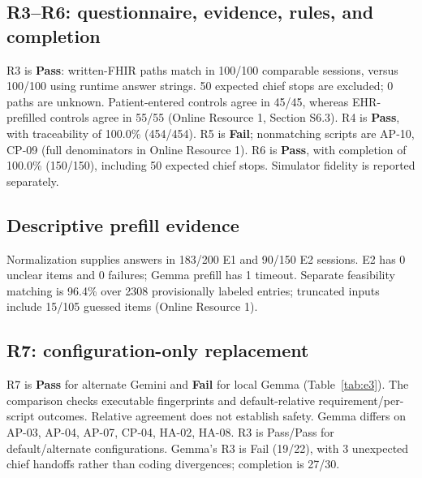 \documentclass[lineno,pdflatex,sn-basic]{sn-jnl}%
\theoremstyle{thmstyleone}%
\theoremstyle{thmstyletwo}%
\theoremstyle{thmstylethree}%
\newcommand{\RThreeVerdict}{Pass}
\newcommand{\RFourVerdict}{Pass}
\newcommand{\RFiveVerdict}{Fail}
\newcommand{\RFiveFailingScripts}{AP-10, CP-09}
\newcommand{\RSixVerdict}{Pass}
\newcommand{\EThreeDefaultRThreeVerdict}{Pass}
\newcommand{\EThreeAlternateSwapVerdict}{Pass}
\newcommand{\EThreeAlternateRThreeVerdict}{Pass}
\newcommand{\EThreeLocalSwapVerdict}{Fail}
\newcommand{\EThreeLocalSwapFailingScripts}{AP-03, AP-04, AP-07, CP-04, HA-02, HA-08}
\newcommand{\EThreeLocalRThreeVerdict}{Fail}
\newcommand{\EOnePrefillSessions}{200}
\newcommand{\EOnePrefillStatusNormalized}{183}
\newcommand{\ETwoPrefillSessions}{150}
\newcommand{\ETwoPrefillUnclearEntries}{0}
\newcommand{\ETwoPrefillFailed}{0}
\newcommand{\ETwoPrefillStatusNormalized}{90}
\newcommand{\EThreeLocalPrefillFailed}{1}
\newcommand{\PrefillFeasibilityScored}{2308}
\newcommand{\PrefillFeasibilityExactRate}{96.4\%}
\newcommand{\PrefillFeasibilityTruncated}{105}
\newcommand{\PrefillFeasibilityTruncatedGuessed}{15}
\newcommand{\ETwoWrittenPathAgree}{100}
\newcommand{\ETwoWrittenPathCompared}{100}
\newcommand{\ETwoWrittenPathExcluded}{50}
\newcommand{\ETwoWrittenPathUnknown}{0}
\newcommand{\ETwoWrittenPathPatientControllerAgree}{45}
\newcommand{\ETwoWrittenPathPatientControllerCompared}{45}
\newcommand{\ETwoWrittenPathEhrControllerAgree}{55}
\newcommand{\ETwoWrittenPathEhrControllerCompared}{55}
\newcommand{\EThreeGemmaWrittenPathAgree}{19}
\newcommand{\EThreeGemmaWrittenPathCompared}{22}
\newcommand{\ETwoFixtureActualPathAgree}{100}
\newcommand{\ETwoFixtureActualPathCompared}{100}
\newcommand{\ETwoChiefStopsCompleted}{50}
\newcommand{\ETwoCompletion}{100.0\% (150/150)}
\newcommand{\EThreeLocalSessions}{30}
\newcommand{\EThreeLocalCompleted}{27}
\newcommand{\EThreeLocalHandoffs}{3}
\newcommand{\ETwoTraceability}{100.0\% (454/454)}
\begin{document}
\subsection{R3--R6: questionnaire, evidence, rules, and completion}
R3 is \textbf{\RThreeVerdict{}}: written-FHIR paths match in
\ETwoWrittenPathAgree{}/\ETwoWrittenPathCompared{} comparable sessions, versus
\ETwoFixtureActualPathAgree{}/\ETwoFixtureActualPathCompared{} using runtime
answer strings. \ETwoWrittenPathExcluded{} expected chief stops are excluded;
\ETwoWrittenPathUnknown{} paths are unknown.
Patient-entered controls agree in
\ETwoWrittenPathPatientControllerAgree{}/\ETwoWrittenPathPatientControllerCompared{},
whereas EHR-prefilled controls agree in
\ETwoWrittenPathEhrControllerAgree{}/\ETwoWrittenPathEhrControllerCompared{}
(Online Resource 1, Section S6.3). R4 is \textbf{\RFourVerdict{}}, with traceability
of \ETwoTraceability{}. R5 is \textbf{\RFiveVerdict{}}; nonmatching scripts are
\RFiveFailingScripts{} (full denominators in Online Resource 1).
R6 is \textbf{\RSixVerdict{}}, with completion of \ETwoCompletion{}, including
\ETwoChiefStopsCompleted{} expected chief stops. Simulator fidelity is reported separately.

\subsection{Descriptive prefill evidence}
Normalization supplies answers in \EOnePrefillStatusNormalized{}/\EOnePrefillSessions{}
E1 and \ETwoPrefillStatusNormalized{}/\ETwoPrefillSessions{} E2 sessions.
E2 has \ETwoPrefillUnclearEntries{} unclear items and \ETwoPrefillFailed{} failures;
Gemma prefill has \EThreeLocalPrefillFailed{} timeout.
Separate feasibility matching is \PrefillFeasibilityExactRate{} over
\PrefillFeasibilityScored{} provisionally labeled entries; truncated inputs include
\PrefillFeasibilityTruncatedGuessed{}/\PrefillFeasibilityTruncated{} guessed items
(Online Resource 1).

\subsection{R7: configuration-only replacement}
R7 is \textbf{\EThreeAlternateSwapVerdict{}} for alternate Gemini and
\textbf{\EThreeLocalSwapVerdict{}} for local Gemma
(Table~\ref{tab:e3}). The comparison checks executable fingerprints and default-relative
requirement/per-script outcomes. Relative agreement does not establish safety.
Gemma differs on \EThreeLocalSwapFailingScripts{}.
R3 is \EThreeDefaultRThreeVerdict{}/\EThreeAlternateRThreeVerdict{} for
default/alternate configurations. Gemma's R3 is \EThreeLocalRThreeVerdict{}
(\EThreeGemmaWrittenPathAgree{}/\EThreeGemmaWrittenPathCompared{}), with
\EThreeLocalHandoffs{} unexpected chief handoffs rather than coding divergences;
completion is \EThreeLocalCompleted{}/\EThreeLocalSessions{}.
\end{document}
